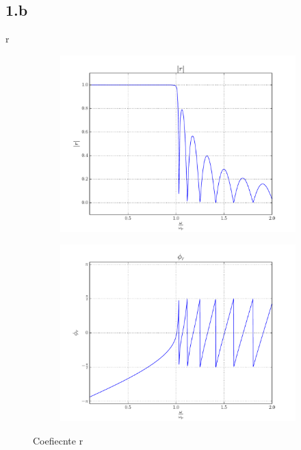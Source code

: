 \documentclass[a4paper,11pt]{article}
\begin{document}
\subsection*{1.b}
r
\begin{figure}
    \begin{subfigure}[b]{0.48\textwidth}
        \includegraphics[width=\textwidth]{Punto1BC/r_N.pdf}
    \end{subfigure}
    \begin{subfigure}[b]{0.48\textwidth}
        \includegraphics[width=\textwidth]{Punto1BC/r_f.pdf}
    \end{subfigure}
    \caption{Coefiecnte r}\label{r}
\end{figure}
\end{document}
